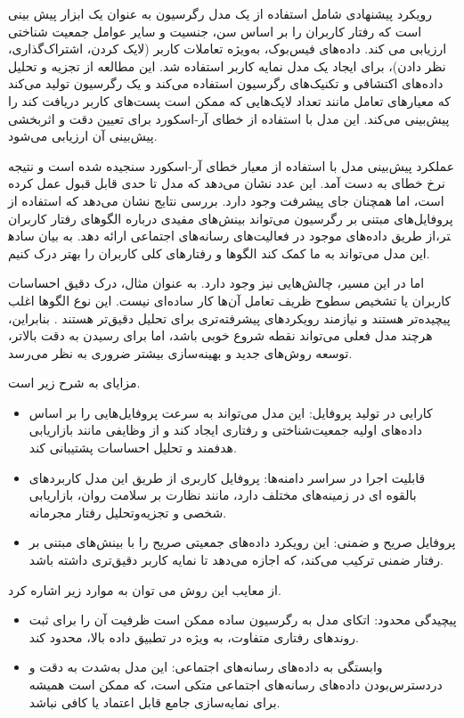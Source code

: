 رویکرد پیشنهادی شامل استفاده از یک مدل رگرسیون به عنوان یک ابزار پیش بینی است که رفتار کاربران را بر اساس سن، جنسیت و سایر عوامل جمعیت شناختی ارزیابی می کند. داده‌های فیس‌بوک، به‌ویژه تعاملات کاربر (لایک کردن، اشتراک‌گذاری، نظر دادن)، برای ایجاد یک مدل نمایه کاربر استفاده شد. این مطالعه از تجزیه و تحلیل داده‌های اکتشافی و تکنیک‌های رگرسیون استفاده می‌کند و یک رگرسیون تولید می‌کند که معیارهای تعامل مانند تعداد لایک‌هایی که ممکن است پست‌های کاربر دریافت کند را پیش‌بینی می‌کند. این مدل با استفاده از خطای 
آر-اسکورد%
برای تعیین دقت و اثربخشی پیش‌بینی آن ارزیابی می‌شود.
\newcommand{\RLnum}[1]{#1} %
\newcommand{\num}[1]{%
   \LR{\hspace{0pt}#1\hspace{0pt}}
}

عملکرد پیش‌بینی مدل با استفاده از معیار خطای آر-اسکورد سنجیده شده است و نتیجه نرخ خطای \num{۰.۱۹۹} به دست آمد. 
این عدد نشان می‌دهد که مدل تا حدی قابل قبول عمل کرده است، اما همچنان جای پیشرفت وجود دارد. بررسی نتایج نشان می‌دهد که استفاده از پروفایل‌های مبتنی بر رگرسیون می‌تواند بینش‌های مفیدی درباره الگوهای رفتار کاربران از طریق داده‌های موجود در فعالیت‌های رسانه‌های اجتماعی ارائه دهد. به بیان ساده‎تر، این مدل می‌تواند به ما کمک کند الگوها و رفتارهای کلی کاربران را بهتر درک کنیم.

اما در این مسیر، چالش‌هایی نیز وجود دارد. به عنوان مثال، درک دقیق احساسات کاربران یا تشخیص سطوح ظریف تعامل آن‌ها کار ساده‌ای نیست. این نوع الگوها اغلب پیچیده‌تر هستند و نیازمند رویکردهای پیشرفته‌تری برای تحلیل دقیق‌تر هستند%
\cite{azzam2022model}
. بنابراین، هرچند مدل فعلی می‌تواند نقطه شروع خوبی باشد، اما برای رسیدن به دقت بالاتر، توسعه روش‌های جدید و بهینه‌سازی بیشتر ضروری به نظر می‌رسد.


مزایای %
\cite{azzam2022model}
 به شرح زیر است.
\begin{itemize}
\item
کارایی در تولید پروفایل: این مدل می‌تواند به سرعت پروفایل‌هایی را بر اساس داده‌های اولیه جمعیت‌شناختی و رفتاری ایجاد کند و از وظایفی مانند بازاریابی هدفمند و تحلیل احساسات پشتیبانی کند.
\item
قابلیت اجرا در سراسر دامنه‌ها: پروفایل کاربری از طریق این مدل کاربردهای بالقوه ای در زمینه‌های مختلف دارد، مانند نظارت بر سلامت روان، بازاریابی شخصی و تجزیه‌وتحلیل رفتار مجرمانه.
\item
پروفایل صریح و ضمنی: این رویکرد داده‌های جمعیتی صریح را با بینش‌های مبتنی بر رفتار ضمنی ترکیب می‌کند، که اجازه می‌دهد تا نمایه کاربر دقیق‌تری داشته باشد.
\end{itemize}
از معایب این روش می توان به موارد زیر اشاره کرد.
\begin{itemize}
\item
پیچیدگی محدود: اتکای مدل به رگرسیون ساده ممکن است ظرفیت آن را برای ثبت روندهای رفتاری متفاوت، به ویژه در تطبیق داده بالا، محدود کند.
\item
وابستگی به داده‌های رسانه‌های اجتماعی: این مدل به‌شدت به دقت و دردسترس‌بودن داده‌های رسانه‌های اجتماعی متکی است، که ممکن است همیشه برای نمایه‌سازی جامع قابل اعتماد یا کافی نباشد.
\end{itemize}


